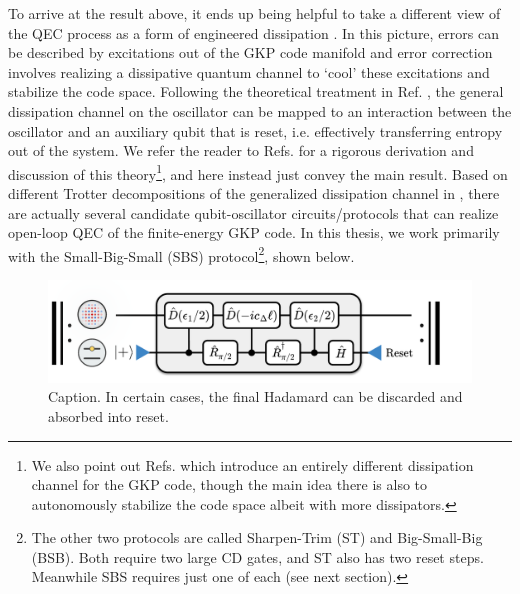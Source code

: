 To arrive at the result above, it ends up being helpful to take a different view of the QEC process as a form of engineered dissipation \cite{royer2020gkp, vlad2023thesis}. In this picture, errors can be described by excitations out of the GKP code manifold and error correction involves realizing a dissipative quantum channel to `cool' these excitations and stabilize the code space. Following the theoretical treatment in Ref. \cite{royer2020gkp}, the general dissipation channel on the oscillator can be mapped to an interaction between the oscillator and an auxiliary qubit that is reset, i.e. effectively transferring entropy out of the system. We refer the reader to Refs. \cite{royer2020gkp, sivak2023gkp-expt, vlad2023thesis} for a rigorous derivation and discussion of this theory\footnote{We also point out Refs. \cite{sellem2023gkp, sellem2024gkp} which introduce an entirely different dissipation channel for the GKP code, though the main idea there is also to autonomously stabilize the code space albeit with more dissipators.}, and here instead just convey the main result. Based on different Trotter decompositions of the generalized dissipation channel in \cite{royer2020gkp}, there are actually several candidate qubit-oscillator circuits/protocols that can realize open-loop QEC of the finite-energy GKP code. In this thesis, we work primarily with the Small-Big-Small (SBS) protocol\footnote{The other two protocols are called Sharpen-Trim (ST) and Big-Small-Big (BSB). Both require two large CD gates, and ST also has two reset steps. Meanwhile SBS requires just one of each (see next section).}, shown below. 
\begin{figure}[h]
    \centering
    \includegraphics[width=0.85\linewidth]{Figures/2/SBS.pdf}
    \caption{Caption. In certain cases, the final Hadamard can be discarded and absorbed into reset.}
    \label{fig:2-SBS}
\end{figure}

